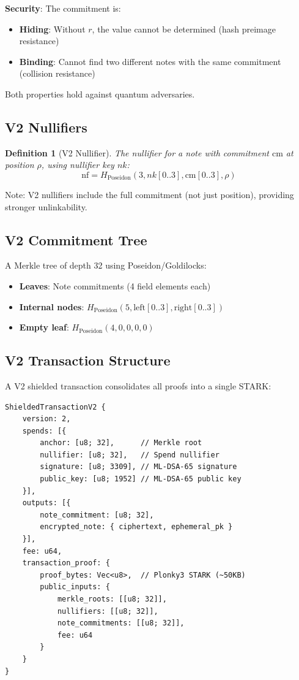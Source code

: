 \documentclass[11pt,a4paper]{article}
\newtheorem{definition}{Definition}
\begin{document}
\textbf{Security}: The commitment is:
\begin{itemize}
    \item \textbf{Hiding}: Without $r$, the value cannot be determined (hash preimage resistance)
    \item \textbf{Binding}: Cannot find two different notes with the same commitment (collision resistance)
\end{itemize}

Both properties hold against quantum adversaries.

\subsection{V2 Nullifiers}

\begin{definition}[V2 Nullifier]
The nullifier for a note with commitment $\text{cm}$ at position $\rho$, using nullifier key $nk$:
\begin{equation}
\text{nf} = H_{\text{Poseidon}}(3, nk[0..3], \text{cm}[0..3], \rho)
\end{equation}
\end{definition}

Note: V2 nullifiers include the full commitment (not just position), providing stronger unlinkability.

\subsection{V2 Commitment Tree}

A Merkle tree of depth 32 using Poseidon/Goldilocks:

\begin{itemize}
    \item \textbf{Leaves}: Note commitments (4 field elements each)
    \item \textbf{Internal nodes}: $H_{\text{Poseidon}}(5, \text{left}[0..3], \text{right}[0..3])$
    \item \textbf{Empty leaf}: $H_{\text{Poseidon}}(4, 0, 0, 0, 0)$
\end{itemize}

\subsection{V2 Transaction Structure}

A V2 shielded transaction consolidates all proofs into a single STARK:

\begin{lstlisting}
ShieldedTransactionV2 {
    version: 2,
    spends: [{
        anchor: [u8; 32],      // Merkle root
        nullifier: [u8; 32],   // Spend nullifier
        signature: [u8; 3309], // ML-DSA-65 signature
        public_key: [u8; 1952] // ML-DSA-65 public key
    }],
    outputs: [{
        note_commitment: [u8; 32],
        encrypted_note: { ciphertext, ephemeral_pk }
    }],
    fee: u64,
    transaction_proof: {
        proof_bytes: Vec<u8>,  // Plonky3 STARK (~50KB)
        public_inputs: {
            merkle_roots: [[u8; 32]],
            nullifiers: [[u8; 32]],
            note_commitments: [[u8; 32]],
            fee: u64
        }
    }
}
\end{lstlisting}
\end{document}
